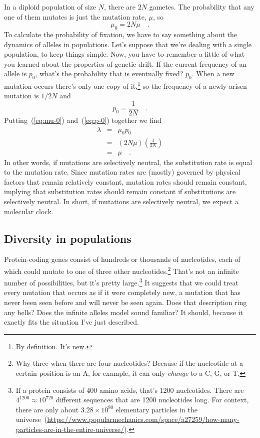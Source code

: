 \documentclass[12pt]{article}
\begin{document}
In a diploid population of size $N$, there are $2N$ gametes. The
probability that any one of them mutates is just the mutation rate,
$\mu$, so
\begin{equation}
\mu_0 = 2N\mu \quad . \label{eq:mu-0}
\end{equation}
To calculate the probability of fixation, we have to say something
about the dynamics of alleles in populations. Let's suppose that we're
dealing with a single population, to keep things simple. Now, you have
to remember a little of what you learned about the properties of
genetic drift. If the current frequency of an allele is $p_0$, what's
the probability that is eventually fixed?  $p_0$. When a new mutation
occurs there's only one copy of it,\footnote{By definition. It's new.}
so the frequency of a newly arisen mutation is $1/2N$ and
\begin{equation}
p_0 = \frac{1}{2N} \quad . \label{eq:p-0}
\end{equation}
Putting~(\ref{eq:mu-0}) and~(\ref{eq:p-0}) together we find
\begin{eqnarray*}
\lambda &=& \mu_0p_0 \\
        &=& (2N\mu)\left(\frac{1}{2N}\right) \\
        &=& \mu \quad .
\end{eqnarray*}
In other words, if mutations are selectively neutral, the substitution
rate is equal to the mutation rate. Since mutation rates are (mostly)
governed by physical factors that remain relatively constant, mutation
rates should remain constant, implying that substitution rates should
remain constant if substitutions are selectively neutral. In short, if
mutations are selectively neutral, we expect a molecular
clock.

\subsection*{Diversity in populations}

Protein-coding genes consist of hundreds or thousands of nucleotides,
each of which could mutate to one of three other
nucleotides.\footnote{Why three when there are four nucleotides?
  Because if the nucleotide at a certain position is an A, for
  example, it can only {\it change\/} to a C, G, or T.} That's not an
infinite number of possibilities, but it's pretty large.\footnote{If a
  protein consists of 400 amino acids, that's 1200 nucleotides. There
  are $4^{1200} \approx 10^{720}$ different sequences that are 1200
  nucleotides long. For context, there are only about
  $3.28 \times 10^{80}$ elementary particles in the
  universe~(\url{https://www.popularmechanics.com/space/a27259/how-many-particles-are-in-the-entire-universe/}).}
It suggests that we could treat every mutation that occurs as if it
were completely new, a mutation that has never been seen before and
will never be seen again. Does that description ring any bells? Does
the infinite alleles model sound familiar? It should, because it
exactly fits the situation I've just
described.
\end{document}
